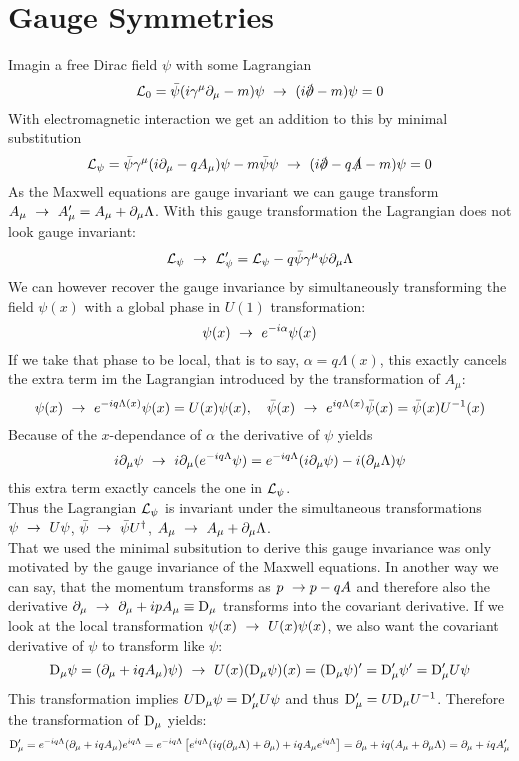 \section{Gauge Symmetries}
Imagin a free Dirac field $\psi$ with some Lagrangian
\[ \LL_0 = \bar{\psi}( i \gamma^\mu \p_\mu - m) \psi ~\df~(i \slashed{\p} - m )\psi = 0\]
With electromagnetic interaction we get an addition to this by minimal substitution
\[ \LL_\psi = \bar{\psi}\gamma^\mu ( i \p_\mu - q A_\mu) \psi - m \bar{\psi}\psi ~\df~ (i \slashed{\p} - q \slashed{A}- m) \psi = 0\]
As the Maxwell equations are gauge invariant we can gauge transform $A_\mu ~\rightarrow~A'_\mu = A_\mu + \partial_\mu \Lambda$. With this gauge transformation the Lagrangian does not look gauge invariant:
\[\mathcal{L}_\psi ~\rightarrow~ \mathcal{L}'_\psi = \mathcal{L}_\psi - q \bar{\psi}\gamma^\mu \psi \partial_\mu \Lambda\]
We can however recover the gauge invariance by simultaneously transforming the field $\psi(x)$ with a global phase in $U(1)$ transformation:
\[ \psi(x) ~\rightarrow~ e^{-i \alpha} \psi(x)\]
If we take that phase to be local, that is to say, $\alpha = q \Lambda(x)$, this exactly cancels the extra term im the Lagrangian introduced by the transformation of $A_\mu$:
\[ \psi(x) ~\rightarrow~ e^{-iq \Lambda(x)} \psi(x) = U(x) \psi(x),~~~ \bar{\psi}(x) ~\rightarrow~ e^{iq\Lambda(x)} \bar{\psi}(x) = \bar{\psi}(x) U^{-1}(x)\]
Because of the $x$-dependance of $\alpha$ the derivative of $\psi$ yields
\[ i \partial_\mu \psi ~\rightarrow~ i \partial_\mu ( e^{-iq\Lambda} \psi) = e^{-iq\Lambda}(i \partial_\mu \psi) - i ( \partial_\mu\Lambda) \psi\]
this extra term exactly cancels the one in $\mathcal{L}_\psi$.\\
Thus the Lagrangian $\mathcal{L}_\psi$ is invariant under the simultaneous transformations $\psi ~\rightarrow~U\psi$, $\bar{\psi}~\rightarrow~\bar{\psi}U^\dagger$, $A_\mu ~\rightarrow~A_\mu + \partial_\mu \Lambda$.\\
That we used the minimal subsitution to derive this gauge invariance was only motivated by the gauge invariance of the Maxwell equations. In another way we can say, that the momentum transforms as $p ~\rightarrow p - q A$ and therefore also the derivative $\partial_\mu ~\rightarrow~ \partial_\mu + i p A_\mu \equiv {\rm D}_\mu$ transforms into the covariant derivative. If we look at the local transformation $\psi(x) ~\rightarrow~ U(x)\psi(x)$, we also want the covariant derivative of $\psi$ to transform like $\psi$:
\[ {\rm D}_\mu \psi = ( \partial _\mu + i q A_\mu) \psi) ~\rightarrow~ U(x)( {\rm D}_\mu \psi)(x) = ({\rm D}_\mu\psi)' = {\rm D}'_\mu \psi' = {\rm D}'_\mu U \psi \]
This transformation implies $U{\rm D}_\mu \psi = {\rm D}'_\mu U \psi$ and thus ${\rm D}'_\mu = U {\rm D}_\mu U^{-1}$. Therefore the transformation of ${\rm D}_\mu$ yields:
\[ {\rm D}'_\mu = e^{-iq\Lambda}( \partial_\mu + i q A_\mu) e^{i q \Lambda} = e^{-iq\Lambda}\left[ e^{iq\Lambda}(iq (\partial_\mu \Lambda) + \partial_\mu) + i q A_\mu e^{iq\Lambda}\right] = \partial_\mu + iq(A_\mu + \partial_\mu \Lambda) = \partial_\mu + iq A'_\mu\]
